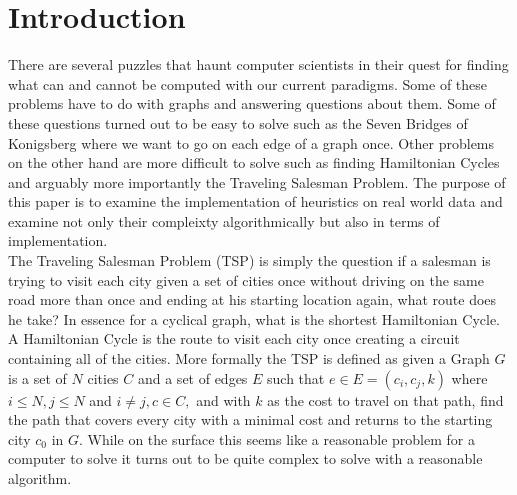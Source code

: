 \documentclass[midd]{thesis}
\newcommand{\tab}{\hspace*{2em}}
\begin{document}
\chapter{Introduction}
\tab There are several puzzles that haunt computer scientists in their quest for finding what can and cannot be computed with our current paradigms. Some of these problems have to do with graphs and answering questions about them. Some of these questions turned out to be easy to solve such as the Seven Bridges of Konigsberg where we want to go on each edge of a graph once. Other problems on the other hand are more difficult to solve such as finding Hamiltonian Cycles and arguably more importantly the Traveling Salesman Problem. The purpose of this paper is to examine the implementation of heuristics on real world data and examine not only their compleixty algorithmically but also in terms of implementation.\\
\tab The Traveling Salesman Problem (TSP) is simply the question if a salesman is trying to visit each city given a set of cities once without driving on the same road more than once and ending at his starting location again, what route does he take? In essence for a cyclical graph, what is the shortest Hamiltonian Cycle. A Hamiltonian Cycle is the route to visit each city once creating a circuit containing all of the cities. More formally the TSP is defined as given a Graph $G$ is a set of $N$ cities $C$ and a set of edges $E$ such that $e \in E = (c_{i}, c_{j},k)$ where $i \le N, j \le N$ and $i \ne j, c \in C,$ and with $k$ as the cost to travel on that path, find the path that covers every city with a minimal cost and returns to the starting city $c_{0}$ in $G$. While on the surface this seems like  a reasonable problem for a computer to solve it turns out to be quite complex to solve with a reasonable algorithm.\\
\end{document}
